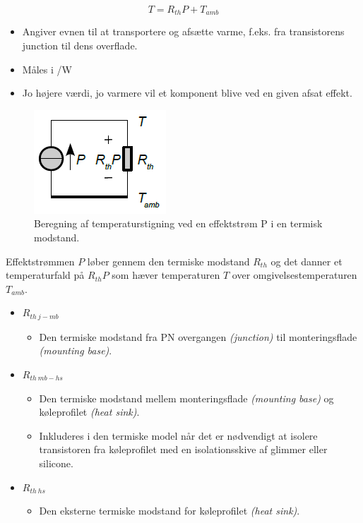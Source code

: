 \documentclass[danish]{article}
\begin{document}
\begin{equation}
T = R_{th} P + T_{amb}
\end{equation}

\begin{itemize}
	\item Angiver evnen til at transportere og afsætte varme, f.eks. fra transistorens junction til dens overflade.
	\item Måles i \SIUnitSymbolCelsius /\si{\watt}
	\item Jo højere værdi, jo varmere vil et komponent blive ved en given afsat effekt.
\end{itemize}

\begin{figure} [H]
	\centering
	\includegraphics[width=0.3\linewidth]{graphics/ohmslovanalogi}
	\caption{Beregning af temperaturstigning ved en effektstrøm P i en termisk modstand.}
	\label{fig:ohmslovanalogi}
\end{figure}

Effektstrømmen $P$ løber gennem den termiske modstand $R_{th}$ og det
danner et temperaturfald på $R_{th}P$ som hæver temperaturen $T$ over omgivelsestemperaturen $T_{amb}$.

\newpage
\begin{itemize}
	\item $R_{th\:j-mb}$
	\begin{itemize}
		\item Den termiske modstand fra PN overgangen \textit{(junction)} til monteringsflade	\textit{(mounting base)}.
	\end{itemize}
	\item $R_{th\: mb-hs}$
	\begin{itemize}
		\item Den termiske modstand mellem monteringsflade	\textit{(mounting base)} og køleprofilet \textit{(heat sink)}.
		\item Inkluderes i den termiske model når det er nødvendigt at isolere transistoren fra køleprofilet med en isolationsskive af glimmer eller silicone.
	\end{itemize} 
	\item $R_{th\: hs}$ 
	\begin{itemize}
		\item Den eksterne termiske modstand for køleprofilet \textit{(heat sink)}.
	\end{itemize}
\end{itemize}
\end{document}
